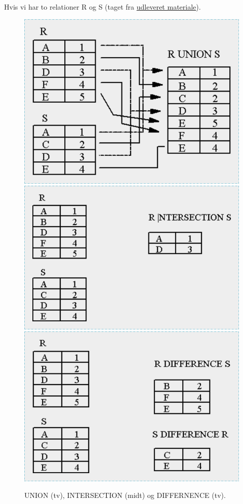 Hvis vi har to relationer R og S (taget fra \href{http://db.grussell.org/section010.html#_Toc67114476}{udleveret materiale}). 

%	
%	
%	

\begin{figure}[H]
	\centering
	\includegraphics[width=.31\textwidth]{figs/spm6/unionexample}\hfill
	\includegraphics[width=.35\textwidth]{figs/spm6/intersectionexample}\hfill
	\includegraphics[width=.33\textwidth]{figs/spm6/differenceexample}	
	\caption{UNION (tv), INTERSECTION (midt) og DIFFERNENCE (tv).}
	\label{fig:union_intersection_difference_example}	
\end{figure}